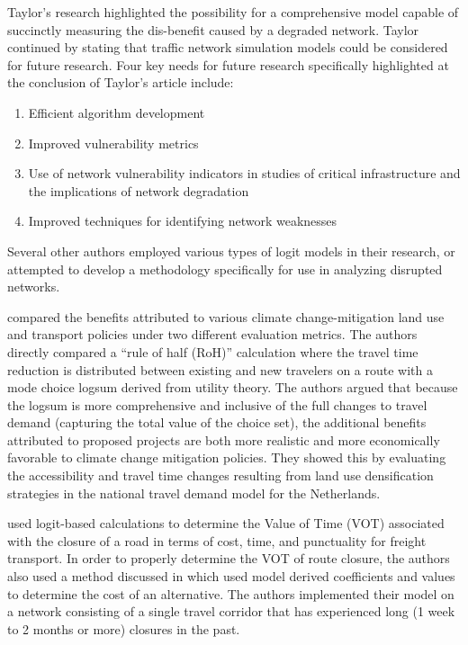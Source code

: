 Taylor's research highlighted the possibility for a comprehensive model capable
of succinctly measuring the dis-benefit caused by a degraded network.
Taylor continued by stating that traffic network simulation models
could be considered for future research.  Four key needs for
future research specifically highlighted at the conclusion of Taylor's article include:

	\begin{enumerate}
		\item Efficient algorithm development
		\item Improved vulnerability metrics
		\item Use of network vulnerability indicators in studies of critical
		infrastructure and the implications of network degradation
		\item Improved techniques for identifying network weaknesses
	\end{enumerate}

\noindent Several other authors employed various types of logit models in their research,
or attempted to develop a methodology specifically for use in analyzing disrupted networks.

\citet{geurs2010} compared the benefits attributed to various climate
change-mitigation land use and transport policies under two different
evaluation metrics. The authors directly compared a “rule of half (RoH)”
calculation where the travel time reduction is distributed between existing
and new travelers on a route with a mode choice logsum derived from utility
theory. The authors argued that because the logsum is more comprehensive and
inclusive of the full changes to travel demand (capturing the total value of
the choice set), the additional benefits attributed to proposed projects are
both more realistic and more economically favorable to climate change
mitigation policies. They showed this by evaluating the accessibility and
travel time changes resulting from land use densification strategies in the
national travel demand model for the Netherlands.

\citet{Masiero2012} used logit-based calculations to determine the Value of
Time (VOT) associated with the closure of a road in terms of cost, time,
and punctuality for freight transport. In order to properly determine the
VOT of route closure, the authors also used a method discussed in
\citet{koppelman2006} which used model derived coefficients and values to
determine the cost of an alternative. The authors implemented their
model on a network consisting of a single travel corridor that has
experienced long (1 week to 2 months or more) closures in the past.

